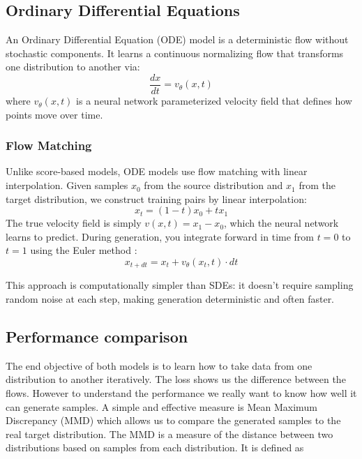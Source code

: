 \documentclass[conference,a4paper]{IEEEtran}
\begin{document}
\subsection{Ordinary Differential Equations}

An Ordinary Differential Equation (ODE) model \cite{lipmanFlowMatchingGenerative2023} is a deterministic flow without stochastic components. It learns a continuous normalizing flow that transforms one distribution to another via:
\begin{equation}
    \frac{dx}{dt} = v_\theta(x, t)
\end{equation}
where $v_\theta(x, t)$ is a neural network parameterized velocity field that defines how points move over time.

\subsubsection{Flow Matching} Unlike score-based models, ODE models use flow matching with linear interpolation. Given samples $x_0$ from the source distribution and $x_1$ from the target distribution, we construct training pairs by linear interpolation:
\begin{equation}
    x_t = (1-t)x_0 + tx_1
\end{equation}
The true velocity field is simply $v(x, t) = x_1 - x_0$, which the neural network learns to predict.
During generation, you integrate forward in time from $t=0$ to $t=1$ using the Euler method \cite{burdenNumericalAnalysis2016}:
\begin{equation}
    x_{t+dt} = x_t + v_\theta(x_t, t) \cdot dt
\end{equation}

This approach is computationally simpler than SDEs: it doesn't require sampling random noise at each step, making generation deterministic and often faster.

\subsection{Performance comparison}

The end objective of both models is to learn how to take data from one distribution to another iteratively. The loss shows us the difference between the flows. However to understand the performance we really want to know how well it can generate samples. A simple and effective measure is Mean Maximum Discrepancy (MMD) \cite{grettonKernelMethodTwoSample2008} which allows us to compare the generated samples to the real target distribution. The MMD is a measure of the distance between two distributions based on samples from each distribution. It is defined as
\end{document}
